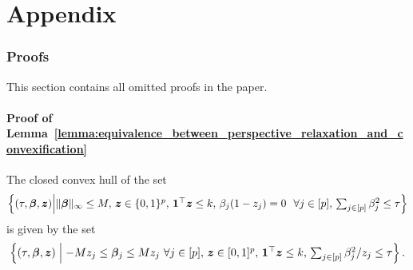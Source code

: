 \appendix
\onecolumn

\part{Appendix} 

\newcommand{\appendixnumberline}[1]{Appendix\space}

\renewcommand{\appendixname}{Appendix}
\renewcommand{\thesection}{\appendixname~\Alph{section}}
\renewcommand{\thesubsection}{\Alph{section}.\arabic{subsection}}

\section{Proofs}
\label{appendix_sec:proofs}
This section contains all omitted proofs in the paper.

\subsection{Proof of Lemma~\ref{lemma:equivalence_between_perspective_relaxation_and_convexification}}

\begin{namedlemma}
    [~\ref{lemma:equivalence_between_perspective_relaxation_and_convexification}]
    The closed convex hull of the set
    \begin{align*}
        \textstyle \left\{ (\tau, \bm{\beta}, \bm{z}) \middle|
        \| \bm{\beta} \|_\infty \leq M, \, \bm{z} \in \{0, 1\}^p, \, \mathbf{1}^\top \bm{z} \leq k, \, \beta_j ( 1 - z_j) = 0 ~~ \forall j \in [p], \, \sum_{j \in [p]} \beta_j^2 \leq \tau \right\}
    \end{align*}
    is given by the set
    \begin{align*}
        \textstyle \left\{ (\tau, \bm{\beta}, \bm{z})  \;\middle|\; -M z_j\leq \bm{\beta}_j \leq M z_j ~ \forall j \in [p], \, \bm{z} \in [0, 1]^p, \, \mathbf{1}^\top \bm{z} \leq k, \, \sum_{j \in [p]} \beta_j^2 / z_j \leq \tau \right\}.
    \end{align*}
\end{namedlemma}

